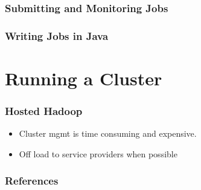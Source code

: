 \documentclass{beamer}
\begin{document}
\frame
{
  \frametitle{Submitting and Monitoring Jobs}

}

\frame
{
  \frametitle{Writing Jobs in Java}
}


\section{Running a Cluster}

\frame 
{
  \frametitle{Hosted Hadoop}
  \begin{itemize}
    \item Cluster mgmt is time consuming and expensive.
    \item Off load to service providers when possible
  \end{itemize}
}


\frame
{
  \frametitle{References}
  \printbibliography
}
\end{document}
